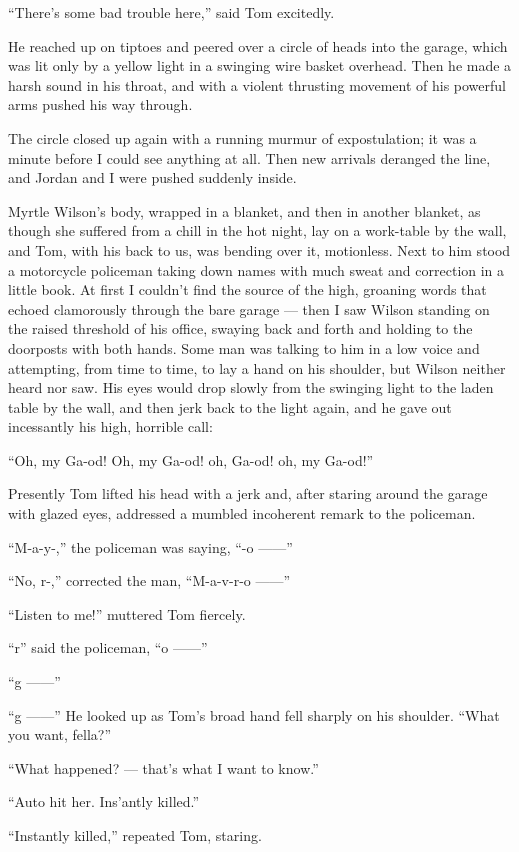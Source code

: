 \documentclass{znotebook}
\begin{document}
``There’s some bad trouble here,'' said Tom excitedly.

He reached up on tiptoes and peered over a circle of heads into the garage, which was lit only by a yellow light in a swinging wire basket overhead. Then he made a harsh sound in his throat, and with a violent thrusting movement of his powerful arms pushed his way through.

The circle closed up again with a running murmur of expostulation; it was a minute before I could see anything at all. Then new arrivals deranged the line, and Jordan and I were pushed suddenly inside.

Myrtle Wilson’s body, wrapped in a blanket, and then in another blanket, as though she suffered from a chill in the hot night, lay on a work-table by the wall, and Tom, with his back to us, was bending over it, motionless. Next to him stood a motorcycle policeman taking down names with much sweat and correction in a little book. At first I couldn’t find the source of the high, groaning words that echoed clamorously through the bare garage — then I saw Wilson standing on the raised threshold of his office, swaying back and forth and holding to the doorposts with both hands. Some man was talking to him in a low voice and attempting, from time to time, to lay a hand on his shoulder, but Wilson neither heard nor saw. His eyes would drop slowly from the swinging light to the laden table by the wall, and then jerk back to the light again, and he gave out incessantly his high, horrible call:

``Oh, my Ga-od! Oh, my Ga-od! oh, Ga-od! oh, my Ga-od!''

Presently Tom lifted his head with a jerk and, after staring around the garage with glazed eyes, addressed a mumbled incoherent remark to the policeman.

``M-a-y-,'' the policeman was saying, ``-o ——''

``No, r-,'' corrected the man, ``M-a-v-r-o ——''

``Listen to me!'' muttered Tom fiercely.

``r'' said the policeman, ``o ——''

``g ——''

``g ——'' He looked up as Tom’s broad hand fell sharply on his shoulder. ``What you want, fella?''

``What happened? — that’s what I want to know.''

``Auto hit her. Ins’antly killed.''

``Instantly killed,'' repeated Tom, staring.
\end{document}
